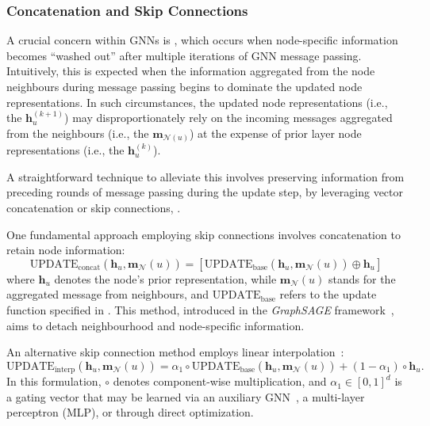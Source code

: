 \subsubsection{Concatenation and Skip Connections} 
A crucial concern within GNNs is , which occurs when node-specific information becomes ``washed out''  after multiple iterations of GNN message passing. Intuitively, this is expected when the information aggregated from the node neighbours during message passing begins to dominate the updated node representations. In such circumstances, the updated node representations (i.e., the $ \mathbf{h}_u^{(k+1)} $) may disproportionately rely on the incoming messages aggregated from the neighbours (i.e., the $ \mathbf{m}_{\mathcal{N}(u)} $) at the expense of prior layer node representations (i.e., the $ \mathbf{h}_u^{(k)} $).

A straightforward technique to alleviate this involves preserving information from preceding rounds of message passing during the update step, by leveraging vector concatenation or skip connections, .

\medskip

One fundamental approach employing skip connections involves concatenation to retain node information:
\begin{equation*}
\text{UPDATE}_{\text{concat}}(\mathbf{h}_u, \mathbf{m}_\mathcal{N}(u)) = [\text{UPDATE}_{\text{base}}(\mathbf{h}_u, \mathbf{m}_\mathcal{N}(u)) \oplus \mathbf{h}_u]
\end{equation*}
where $ \mathbf{h}_u $ denotes the node’s prior representation, while $ \mathbf{m}_\mathcal{N}(u) $ stands for the aggregated message from neighbours, and $ \text{UPDATE}_{\text{base}} $ refers to the update function specified in . This method, introduced in the \textit{GraphSAGE} framework~\cite{Hamilton2017inductiveRepresentationLearning}, aims to detach neighbourhood and node-specific information.

An alternative skip connection method employs linear interpolation~\cite{Pham2017columnNetworksCollectiveClassification}:
\begin{equation*}
\text{UPDATE}_{\text{interp}}(\mathbf{h}_u, \mathbf{m}_\mathcal{N}(u)) = \alpha_1 \circ \text{UPDATE}_{\text{base}}(\mathbf{h}_u, \mathbf{m}_\mathcal{N}(u)) + (1 - \alpha_1) \circ \mathbf{h}_u.
\end{equation*}
In this formulation, $ \circ $ denotes component-wise multiplication, and $ \alpha_1 \in [0,1]^d $ is a gating vector that may be learned via an auxiliary GNN~\cite{Pham2017columnNetworksCollectiveClassification}, a multi-layer perceptron (MLP), or through direct optimization.

